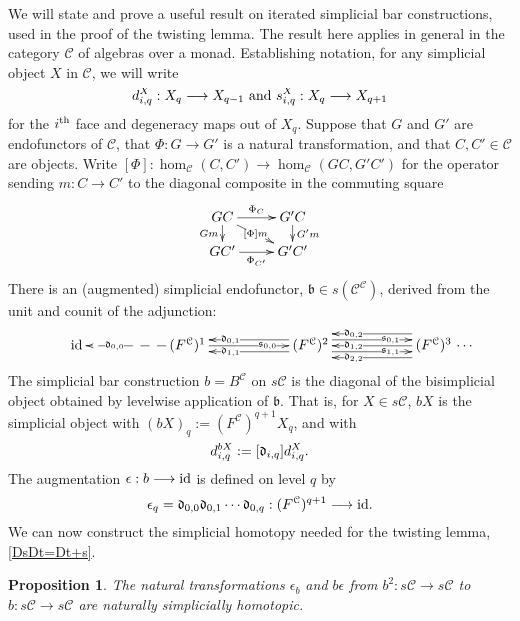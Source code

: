 \documentclass[11pt]{amsart}
\theoremstyle{plain}
\newtheorem{prop}[thm]{Proposition}
\theoremstyle{definition}
\renewcommand{\to}{\longrightarrow}
\newcommand{\fraks}{\mathfrak{s}}
\newcommand{\frakd}{\mathfrak{d}}
\newcommand{\frakb}{\mathfrak{b}}
\newcommand{\calC}{\mathcal{C}}
\newcommand{\calc}{\mathcal{C}}
\theoremstyle{plain}
\newcommand{\Id}{\textup{id}}
\newcommand{\algcat}{{\calC}}%
\newcommand{\algCat}{\calc}
\newcommand{\trip}[3]{{#1}_{\smash{#2}}^{\smash{#3}}}
\newcommand{\barConstructionMightAbbreviate}{b}
\begin{document}
\begin{BK spec seq}
\begin{connectivity}
We will state and prove a useful result on iterated simplicial bar constructions, used in the proof of the twisting lemma. The result here applies in general in the category $\algcat$ of algebras over a monad. Establishing notation, for any simplicial object $X$ in $\algCat$, we will write 
\[\trip{d}{i,q}{X}:X_q\to X_{q-1}\textup{\ and\ }\trip{s}{i,q}{X}:X_q\to X_{q+1}\]
for the $i^\textup{th}$ face and degeneracy maps out of $X_q$. Suppose that $G$ and $G'$ are endofunctors of $\algCat$, that $\Phi:G\to G'$ is a natural transformation, and that $C,C'\in\algCat$ are objects. Write $[\Phi]:\hom_{\algCat}(C,C')\to\hom_{\algCat}(GC,G'C')$ for the operator sending $m:C\to C'$ to the diagonal composite in the commuting square
\[\xymatrix@R=4mm{
GC
\ar[r]^-{\Phi_C}
\ar[d]_-{Gm}
\ar[dr]|-{[\Phi]m}
&%
G'C
\ar[d]^-{G'm}
\\%
GC'
\ar[r]_-{\Phi_{C'}}
&%
G'C'
}\]
There is an (augmented) simplicial endofunctor, $\frakb\in s({\algCat}^{\algCat})$, derived from the unit and counit of the adjunction:
\[\vcenter{
\def\labelstyle{\scriptstyle}
\xymatrix@C=2cm@1{
{\ \Id\,}
&
\,(F^{\algCat})^1\,
\ar@{-->}[l]|(.65){\frakd_{0,0}}
\ar[r]|(.65){\fraks_{0,0}}
&
\,(F^{\algCat})^2\,
\ar@<-1ex>[l]|(.65){\frakd_{0,1}}
\ar@<+1ex>[l]|(.65){\frakd_{1,1}}
\ar@<+1ex>[r]|(.65){\fraks_{0,1}}
\ar@<-1ex>[r]|(.65){\fraks_{1,1}}
&
\,(F^{\algCat})^3\,\makebox[0cm][l]{\,$\cdots $}
\ar[l]|(.65){\frakd_{1,2}}
\ar@<-2ex>[l]|(.65){\frakd_{0,2}}
\ar@<+2ex>[l]|(.65){\frakd_{2,2}}
}}\]
The simplicial bar construction $\barConstructionMightAbbreviate =B^{\algCat}$ on $s\algCat$ is the diagonal of the bisimplicial object obtained by levelwise application of $\frakb$. That is, for $X\in s\algCat$, $\barConstructionMightAbbreviate X$ is the simplicial object with $(\barConstructionMightAbbreviate X)_q:=(F^{\algCat})^{q+1}X_q$, and with
\[\trip{d}{i,q}{\barConstructionMightAbbreviate X}:=[\frakd_{i,q}]\trip{d}{i,q}{X}.\]
The augmentation $\epsilon:\barConstructionMightAbbreviate \to \Id $ is defined on level $q$ by 
\[\epsilon_q=\frakd_{0,0}\frakd_{0,1}\cdots \frakd_{0,q}:(F^{\algCat})^{q+1}\to \Id .\]
We can now construct the simplicial homotopy needed for the twisting lemma, \ref{DsDt=Dt+s}.
\begin{prop}\label{IteratedBarConstructionHomotopy}
The natural transformations $\epsilon_\barConstructionMightAbbreviate $ and $\barConstructionMightAbbreviate \epsilon$ from $\barConstructionMightAbbreviate ^2:s\algcat\to s\algcat$ to $\barConstructionMightAbbreviate :s\algcat\to s\algcat$ are naturally simplicially homotopic.
\end{prop}


\end{connectivity}
\end{BK spec seq}
\end{document}
